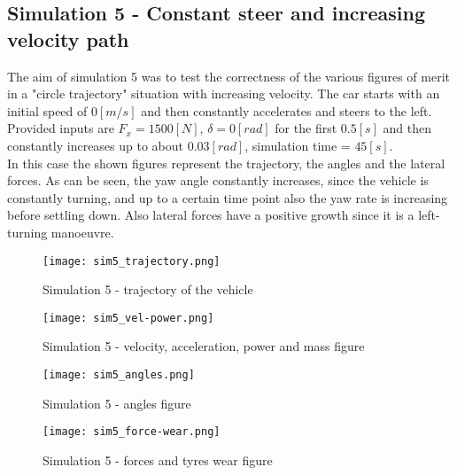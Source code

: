 \documentclass{report}
\let\Oldsubsection\subsection
\renewcommand{\subsection}{\FloatBarrier\Oldsubsection}
\begin{document}
\subsection{Simulation 5 - Constant steer and increasing velocity path}
The aim of simulation 5 was to test the correctness of the various figures of merit in a "circle trajectory" situation with increasing velocity. The car starts with an initial speed of $0[m/s]$ and then constantly accelerates and steers to the left. Provided inputs are $F_x = 1500 [N]$, $\delta = 0 [rad]$ for the first $0.5[s]$ and then constantly increases up to about $0.03 [rad]$, simulation time = $45 [s]$.
\\In this case the shown figures represent the trajectory, the angles and the lateral forces. As can be seen, the yaw angle constantly increases, since the vehicle is constantly turning, and up to a certain time point also the yaw rate is increasing before settling down. Also lateral forces have a positive growth since it is a left-turning manoeuvre.\\ 
\begin{figure}[h!]
    \centering
    \texttt{[image: sim5\_trajectory.png]}
    \caption{Simulation 5 - trajectory of the vehicle}
    \label{fig:sim5_1}
\end{figure}
\begin{figure}[h!]
    \centering
    \texttt{[image: sim5\_vel-power.png]}
    \caption{Simulation 5 - velocity, acceleration, power and mass figure}
    \label{fig:sim5_2}
\end{figure}
\begin{figure}[h!]
    \centering
    \texttt{[image: sim5\_angles.png]}
    \caption{Simulation 5 - angles figure}
    \label{fig:sim5_3}
\end{figure}
\begin{figure}[h!]
    \centering
    \texttt{[image: sim5\_force-wear.png]}
    \caption{Simulation 5 - forces and tyres wear figure}
    \label{fig:sim5_4}
\end{figure}
\end{document}
